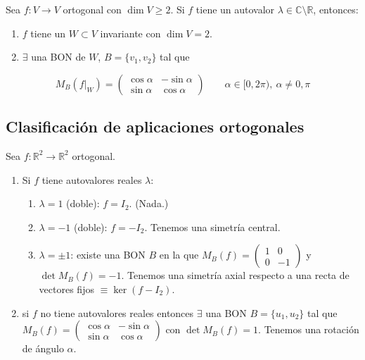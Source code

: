 \documentclass[14pt]{book}
\begin{document}

\begin{pro}
	Sea $f: V \to V$ ortogonal con $\dim V \geq 2$. Si $f$ tiene un autovalor $\lambda \in \mathbb{C}\setminus\mathbb{R}$, entonces:
	\begin{enumerate}
		\item $f$ tiene un $W \subset V$ invariante con $\dim V = 2$.
		\item $\exists$ una BON de $W$, $B = \{v_1, v_2\}$ tal que
	\end{enumerate} 
	\[
		M_B(f\vert_W) = \left(
			\begin{array}{cc}
				\cos \alpha & -\sin \alpha\\
				\sin \alpha & \cos \alpha
			\end{array}
		\right)\qquad \alpha \in [0, 2\pi),\ \alpha ≠ 0, \pi
	\]
\end{pro}

\subsection{Clasificación de aplicaciones ortogonales}
\begin{tm}
	Sea $f: \mathbb{R}^2 \to \mathbb{R}^2$ ortogonal.
	\begin{enumerate}
		\item Si $f$ tiene autovalores reales $\lambda$:
		\begin{enumerate}
			\item $\lambda = 1$ (doble): $f = I_2$. (Nada.)
			\item $\lambda = -1$ (doble): $f = -I_2$. Tenemos una simetría central.
			\item $\lambda = \pm 1$: existe una BON $B$ en la que $M_B(f) = \left(\begin{array}{cc}
			1 & 0 \\ 0 & -1
			\end{array}\right)$ y $\det M_B(f) = -1$. Tenemos una simetría axial respecto a una recta de vectores fijos $\equiv \ker (f - I_2)$.
		\end{enumerate}
		\item si $f$ no tiene autovalores reales entonces $\exists$ una BON $B = \{u_1, u_2\}$ tal que $M_B(f) = \left(\begin{array}{cc}
			\cos \alpha & -\sin \alpha \\ \sin \alpha & \cos \alpha
			\end{array}\right)$ con $\det M_B(f) = 1$. Tenemos una rotación de ángulo $\alpha$.
	\end{enumerate}
\end{tm}
\end{document}
